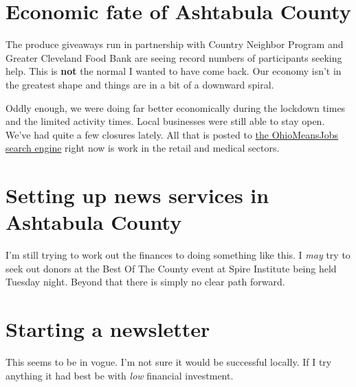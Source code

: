 \section{Economic fate of Ashtabula
County}\label{economic-fate-of-ashtabula-county}

The produce giveaways run in partnership with Country Neighbor Program
and Greater Cleveland Food Bank are seeing record numbers of
participants seeking help. This is \textbf{not} the normal I wanted to
have come back. Our economy isn't in the greatest shape and things are
in a bit of a downward spiral.

Oddly enough, we were doing far better economically during the lockdown
times and the limited activity times. Local businesses were still able
to stay open. We've had quite a few closures lately. All that is posted
to \href{https://ohiomeansjobs.ohio.gov}{the OhioMeansJobs search
engine} right now is work in the retail and medical sectors.

\section{Setting up news services in Ashtabula
County}\label{setting-up-news-services-in-ashtabula-county}

I'm still trying to work out the finances to doing something like this.
I \emph{may} try to seek out donors at the Best Of The County event at
Spire Institute being held Tuesday night. Beyond that there is simply no
clear path forward.

\section{Starting a newsletter}\label{starting-a-newsletter}

This seems to be in vogue. I'm not sure it would be successful locally.
If I try anything it had best be with \emph{low} financial investment.
